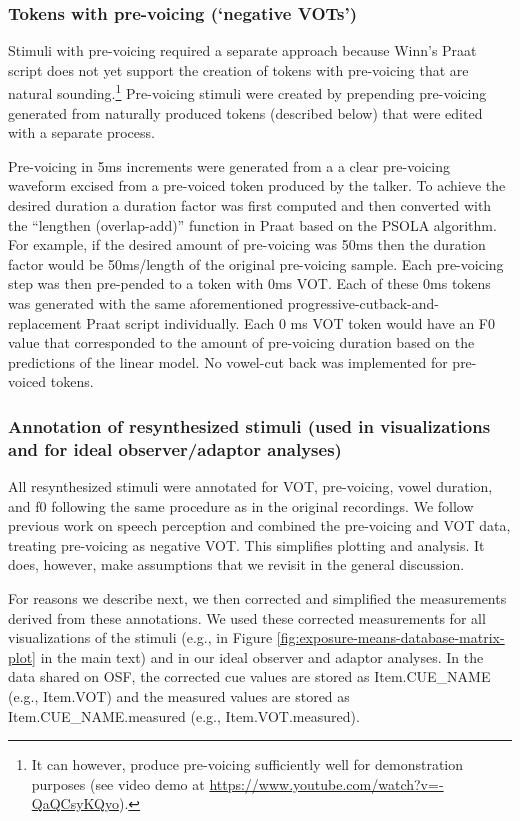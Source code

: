 \documentclass[
  11pt,
  man,mask,floatsintext]{apa6}
\begin{document}
\subsubsection{Tokens with pre-voicing (`negative VOTs')}\label{tokens-with-pre-voicing-negative-vots}

Stimuli with pre-voicing required a separate approach because Winn's Praat script does not yet support the creation of tokens with pre-voicing that are natural sounding.\footnote{It can however, produce pre-voicing sufficiently well for demonstration purposes (see video demo at \url{https://www.youtube.com/watch?v=-QaQCsyKQyo}).} Pre-voicing stimuli were created by prepending pre-voicing generated from naturally produced tokens (described below) that were edited with a separate process.

Pre-voicing in 5ms increments were generated from a a clear pre-voicing waveform excised from a pre-voiced token produced by the talker. To achieve the desired duration a duration factor was first computed and then converted with the ``lengthen (overlap-add)'' function in Praat based on the PSOLA algorithm. For example, if the desired amount of pre-voicing was 50ms then the duration factor would be 50ms/length of the original pre-voicing sample. Each pre-voicing step was then pre-pended to a token with 0ms VOT. Each of these 0ms tokens was generated with the same aforementioned progressive-cutback-and-replacement Praat script individually. Each 0 ms VOT token would have an F0 value that corresponded to the amount of pre-voicing duration based on the predictions of the linear model. No vowel-cut back was implemented for pre-voiced tokens.

\subsubsection{Annotation of resynthesized stimuli (used in visualizations and for ideal observer/adaptor analyses)}\label{annotation-of-resynthesized-stimuli-used-in-visualizations-and-for-ideal-observeradaptor-analyses}

All resynthesized stimuli were annotated for VOT, pre-voicing, vowel duration, and f0 following the same procedure as in the original recordings. We follow previous work on speech perception and combined the pre-voicing and VOT data, treating pre-voicing as negative VOT. This simplifies plotting and analysis. It does, however, make assumptions that we revisit in the general discussion.

For reasons we describe next, we then corrected and simplified the measurements derived from these annotations. We used these corrected measurements for all visualizations of the stimuli (e.g., in Figure \ref{fig:exposure-means-database-matrix-plot} in the main text) and in our ideal observer and adaptor analyses. In the data shared on OSF, the corrected cue values are stored as Item.CUE\_NAME (e.g., Item.VOT) and the measured values are stored as Item.CUE\_NAME.measured (e.g., Item.VOT.measured).
\end{document}
